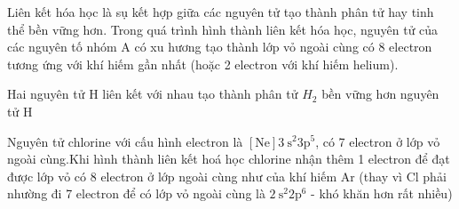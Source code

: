 \begin{paracol}{2}
	\begin{hoplythuyet}
		Liên kết hóa học là sụ kết hợp giữa các nguyên tử tạo thành phân tử hay tinh thể bền vững hơn.
		Trong quá trình hình thành liên kết hóa học, nguyên tử của các nguyên tố nhóm A có xu hương tạo thành lớp vỏ ngoài cùng có 8 electron tương ứng với khí hiếm gần nhất (hoặc 2 electron với khí hiếm helium).
	\end{hoplythuyet}
	\switchcolumn 
	\begin{vdnote}
		Hai nguyên tử H liên kết với nhau tạo thành phân tử $H_2$ bền vững hơn nguyên tử H
	\end{vdnote}
	\begin{vdnote}
		Nguyên tử chlorine với cấu hình electron là $[\mathrm{Ne}] 3 \mathrm{~s}^2 3 \mathrm{p}^5$, có 7 electron ở lớp vỏ ngoài cùng.Khi hình thành liên kết hoá học chlorine nhận thêm 1 electron để đạt được lớp vỏ có 8 electron ở lớp ngoài cùng như của khí hiếm $\mathrm{Ar}$ (thay vì $\mathrm{Cl}$ phải nhường đi 7 electron để có lớp vỏ ngoài cùng là $2 \mathrm{~s}^2 2 \mathrm{p}^6$ - khó khăn hơn rất nhiều)
	\end{vdnote}
\end{paracol}

